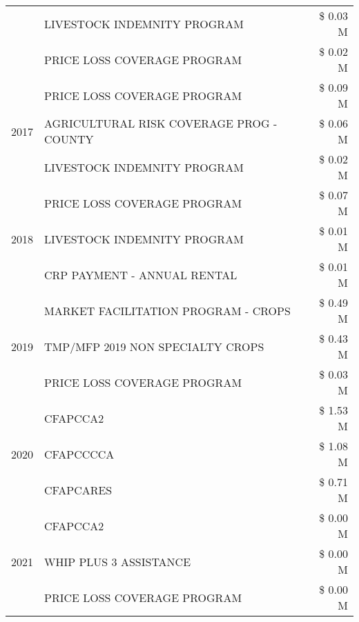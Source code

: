 \begin{tabular}{llr}
 & LIVESTOCK INDEMNITY PROGRAM & \$ 0.03 M \\
 & PRICE LOSS COVERAGE PROGRAM & \$ 0.02 M \\
\cline{1-3}
\multirow[t]{3}{*}{2017} & PRICE LOSS COVERAGE PROGRAM & \$ 0.09 M \\
 & AGRICULTURAL RISK COVERAGE PROG - COUNTY & \$ 0.06 M \\
 & LIVESTOCK INDEMNITY PROGRAM & \$ 0.02 M \\
\cline{1-3}
\multirow[t]{3}{*}{2018} & PRICE LOSS COVERAGE PROGRAM & \$ 0.07 M \\
 & LIVESTOCK INDEMNITY PROGRAM & \$ 0.01 M \\
 & CRP PAYMENT - ANNUAL RENTAL & \$ 0.01 M \\
\cline{1-3}
\multirow[t]{3}{*}{2019} & MARKET FACILITATION PROGRAM - CROPS & \$ 0.49 M \\
 & TMP/MFP 2019 NON SPECIALTY CROPS & \$ 0.43 M \\
 & PRICE LOSS COVERAGE PROGRAM & \$ 0.03 M \\
\cline{1-3}
\multirow[t]{3}{*}{2020} & CFAPCCA2 & \$ 1.53 M \\
 & CFAPCCCCA & \$ 1.08 M \\
 & CFAPCARES & \$ 0.71 M \\
\cline{1-3}
\multirow[t]{3}{*}{2021} & CFAPCCA2 & \$ 0.00 M \\
 & WHIP PLUS 3 ASSISTANCE & \$ 0.00 M \\
 & PRICE LOSS COVERAGE PROGRAM & \$ 0.00 M \\
\cline{1-3}
\bottomrule
\end{tabular}
